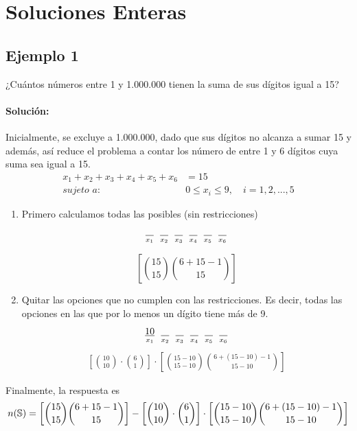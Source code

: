 \section*{Soluciones Enteras}

\subsection*{Ejemplo 1}

¿Cuántos números entre 1 y 1.000.000 tienen la suma de sus dígitos igual a 15?

\paragraph{Solución:} Inicialmente, se excluye a 1.000.000, dado que sus dígitos no alcanza a sumar 15 y además, así reduce el problema a contar los número de entre 1 y 6 dígitos cuya suma sea igual a 15.
\begin{align*}
x_1 + x_2 + x_3 + x_4 + x_5 + x_6&= 15\\
\textit{sujeto a:}\quad& 0\leq x_i \leq 9,\quad i=1,2,...,5
\end{align*}
\begin{enumerate}
\item Primero calculamos todas las posibles (sin restricciones)
\begin{align*}
	\underset{x_1}{~\underline{\hspace{0.3cm}}~}
	\underset{x_2}{~\underline{\hspace{0.3cm}}~}
	\underset{x_3}{~\underline{\hspace{0.3cm}}~}
	\underset{x_4}{~\underline{\hspace{0.3cm}}~}
	\underset{x_5}{~\underline{\hspace{0.3cm}}~}
	\underset{x_6}{~\underline{\hspace{0.3cm}}~}
\end{align*}

\begin{equation*}
\left[\binom{15}{15}\binom{6+15-1}{15}\right]
\end{equation*}

\item Quitar las opciones que no cumplen con las restricciones. Es decir, todas las opciones en las que por lo menos un dígito tiene más de 9.
\begin{align*}
\underset{x_1}{~\underline{10}~}
\underset{x_2}{~\underline{\hspace{0.3cm}}~}
\underset{x_3}{~\underline{\hspace{0.3cm}}~}
\underset{x_4}{~\underline{\hspace{0.3cm}}~}
\underset{x_5}{~\underline{\hspace{0.3cm}}~}
\underset{x_6}{~\underline{\hspace{0.3cm}}~}
\end{align*}
\begin{align*}
\left[\binom{10}{10}\cdot\binom{6}{1}\right]\cdot\left[\binom{15-10}{15-10}\binom{6+(15-10)-1}{15-10}\right]
\end{align*}
\end{enumerate}
Finalmente, la respuesta es
\begin{equation*}
n(\mathbb{S})=\left[\binom{15}{15}\binom{6+15-1}{15}\right]-\left[\binom{10}{10}\cdot\binom{6}{1}\right]\cdot\left[\binom{15-10}{15-10}\binom{6+(15-10)-1}{15-10}\right]
\end{equation*}

